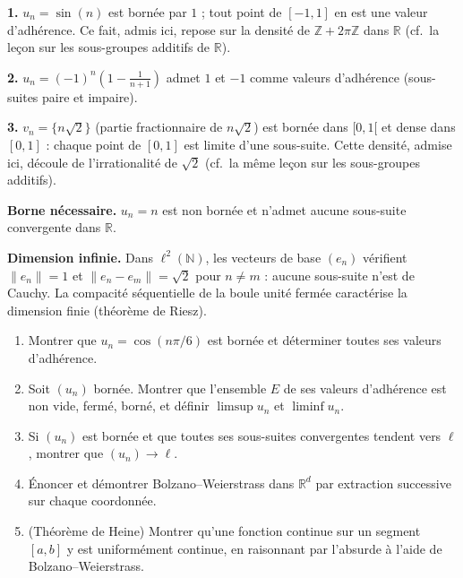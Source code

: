 
\begin{mdframed}[style=exbar]
  \textbf{1.}\enspace%
  $u_n = \sin(n)$ est bornée par $1$ ; tout point de $[-1,1]$ en est une
  valeur d'adhérence. Ce fait, admis ici, repose sur la densité de
  $\mathbb{Z} + 2\pi\mathbb{Z}$ dans $\mathbb{R}$ (cf.\ la leçon sur les
  sous-groupes additifs de $\mathbb{R}$).

  \smallskip\noindent
  \textbf{2.}\enspace%
  $u_n = {(-1)}^n\!\left(1 - \tfrac{1}{n+1}\right)$ admet $1$ et $-1$ comme
  valeurs d'adhérence (sous-suites paire et impaire).

  \smallskip\noindent
  \textbf{3.}\enspace%
  $v_n = \{n\sqrt{2}\}$ (partie fractionnaire de $n\sqrt{2}$) est bornée
  dans $[0,1[$ et dense dans $[0,1]$ :
  chaque point de $[0,1]$ est limite d'une sous-suite. Cette densité,
  admise ici, découle de l'irrationalité de $\sqrt{2}$ (cf.\ la même
  leçon sur les sous-groupes additifs).
\end{mdframed}


\begin{mdframed}[style=cexbar]
  \textbf{Borne nécessaire.}\enspace%
  $u_n = n$ est non bornée et n'admet aucune sous-suite convergente dans
  $\mathbb{R}$.

  \smallskip\noindent
  \textbf{Dimension infinie.}\enspace%
  Dans $\ell^2(\mathbb{N})$, les vecteurs de base $(e_n)$ vérifient
  $\|e_n\| = 1$ et $\|e_n - e_m\| = \sqrt{2}$ pour $n \neq m$ : aucune
  sous-suite n'est de Cauchy. La compacité séquentielle de la boule unité
  fermée caractérise la dimension finie (théorème de Riesz).
\end{mdframed}

\vspace{6pt}
\exolabel

\begin{mdframed}[style=exobar]
  \begin{enumerate}
    \item Montrer que $u_n = \cos(n\pi/6)$ est bornée et déterminer toutes
          ses valeurs d'adhérence.

    \item Soit $(u_n)$ bornée. Montrer que l'ensemble $E$ de ses valeurs
          d'adhérence est non vide, fermé, borné, et définir
          $\limsup u_n$ et $\liminf u_n$.

    \item Si $(u_n)$ est bornée et que toutes ses sous-suites convergentes
          tendent vers $\ell$, montrer que $(u_n) \to \ell$.

    \item Énoncer et démontrer Bolzano--Weierstrass dans $\mathbb{R}^d$
          par extraction successive sur chaque coordonnée.

    \item (Théorème de Heine) Montrer qu'une fonction continue sur un
          segment $[a,b]$ y est uniformément continue, en raisonnant
          par l'absurde à l'aide de Bolzano--Weierstrass.
  \end{enumerate}
\end{mdframed}

